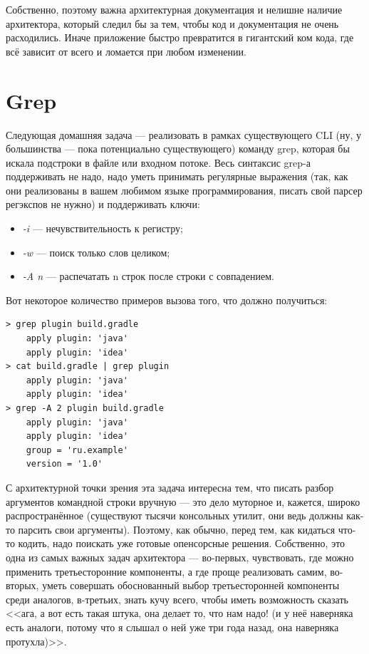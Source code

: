 \documentclass[a5paper]{article}
\begin{document}
Собственно, поэтому важна архитектурная документация и нелишне наличие архитектора, который следил бы за тем, чтобы код и документация не очень расходились. Иначе приложение быстро превратится в гигантский ком кода, где всё зависит от всего и ломается при любом изменении.

\section{Grep}

Следующая домашняя задача --- реализовать в рамках существующего CLI (ну, у большинства --- пока потенциально существующего) команду grep, которая бы искала подстроки в файле или входном потоке. Весь синтаксис grep-а поддерживать не надо, надо уметь принимать регулярные выражения (так, как они реализованы в вашем любимом языке программирования, писать свой парсер регэкспов не нужно) и поддерживать ключи:

\begin{itemize}
	\item \textit{-i} --- нечувствительность к регистру;
	\item \textit{-w}  --- поиск только слов целиком;
	\item \textit{-A n} --- распечатать n строк после строки с совпадением.
\end{itemize}

Вот некоторое количество примеров вызова того, что должно получиться:
\begin{verbatim}
> grep plugin build.gradle
    apply plugin: 'java'
    apply plugin: 'idea'
> cat build.gradle | grep plugin
    apply plugin: 'java'
    apply plugin: 'idea'
> grep -A 2 plugin build.gradle
    apply plugin: 'java'
    apply plugin: 'idea'
    group = 'ru.example'
    version = '1.0'
\end{verbatim}

С архитектурной точки зрения эта задача интересна тем, что писать разбор аргументов командной строки вручную --- это дело муторное и, кажется, широко распространённое (существуют тысячи консольных утилит, они ведь должны как-то парсить свои аргументы). Поэтому, как обычно, перед тем, как кидаться что-то кодить, надо поискать уже готовые опенсорсные решения. Собственно, это одна из самых важных задач архитектора --- во-первых, чувствовать, где можно применить третьесторонние компоненты, а где проще реализовать самим, во-вторых, уметь совершать обоснованный выбор третьесторонней компоненты среди аналогов, в-третьих, знать кучу всего, чтобы иметь возможность сказать <<ага, а вот есть такая штука, она делает то, что нам надо! (и у неё наверняка есть аналоги, потому что я слышал о ней уже три года назад, она наверняка протухла)>>.
\end{document}
